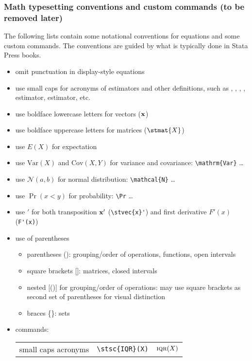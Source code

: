 
\subsubsection*{Math typesetting conventions and custom commands (to be removed later)}

The following lists contain some notational conventions for equations and some 
custom commands. The conventions are guided by what is typically done in Stata Press books.
\begin{itemize}[itemsep=0pt,topsep=0pt]
    \item omit punctuation in display-style equations
    \item use small caps for acronyms of estimators and other definitions, 
       such as , , , ,  estimator,  estimator, etc.
    \item use boldface lowercase letters for vectors ($\mathbf x$)
    \item use boldface uppercase letters for matrices ($\stmat{X}$)
    \item use $E(X)$ for expectation
    \item use $\mathrm{Var}(X)$ and $\mathrm{Cov}(X,Y)$ for 
          variance and covariance: \verb+\mathrm{Var}+ \dots
    \item use $\mathcal{N}(a, b)$ for normal distribution: \verb+\mathcal{N}+ \dots
    \item use $\Pr(x<y)$ for probability: \verb+\Pr+ \dots
    \item use $'$ for both transposition $\mathbf x'$ (\verb+\stvec{x}'+) and first derivative $F'(x)$ (\verb+F'(x)+)
    \item use of parentheses
    \begin{itemize}
        \item parentheses (): grouping/order of operations, functions, open intervals
        \item square brackets []: matrices, closed intervals
        \item nested [()] for grouping/order of operations: may use square brackets as second set of parentheses 
        for visual distinction
        \item braces \{\}: sets
    \end{itemize}
    \item commands:
        \begin{tabular}[t]{lll}
            small caps acronyms      & \verb+\stsc{IQR}(X)+       & $\stsc{IQR}(X)$         \\

\end{tabular}
\end{itemize}
